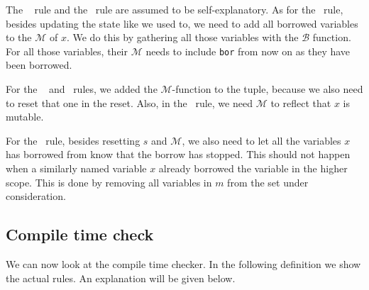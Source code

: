 The \loadsosb ~ rule and the \compsosb ~rule are assumed to be self-explanatory. As for the \asssosb ~rule, besides updating the state like we used to, we need to add all borrowed variables to the $\mathcal{M}$ of $x$. We do this by gathering all those variables with the $\mathcal{B}$ function. For all those variables, their $\mathcal{M}$ needs to include \texttt{bor} from now on as they have been borrowed. 

For the  ~ and  ~rules, we added the $\mathcal{M}$-function to the tuple, because we also need to reset that one in the reset. Also, in the  ~rule, we need $\mathcal{M}$ to reflect that $x$ is mutable. 

For the \setsosb ~rule, besides resetting $s$ and $\mathcal{M}$, we also need to let all the variables $x$ has borrowed from know that the borrow has stopped. This should not happen when a similarly named variable $x$ already borrowed the variable in the higher scope. This is done by removing all variables in $m$ from the set under consideration.  

\subsection{Compile time check}

We can now look at the compile time checker. In the following definition we show the actual rules. An explanation will be given below. 

